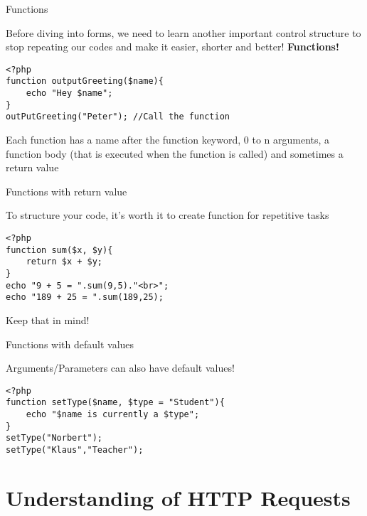 \begin{frame}[fragile]{Functions}

	Before diving into forms, we need to learn another important control structure to stop repeating our codes and make it easier, shorter and better! \pause  \textbf{Functions!} \pause
	
	\begin{lstlisting}
<?php
function outputGreeting($name){
	echo "Hey $name";
}
outPutGreeting("Peter"); //Call the function
	\end{lstlisting} \pause
	
	Each function has a name after the function keyword, 0 to n arguments, a function body (that is executed when the function is called) and sometimes a return value
	
\end{frame}

\begin{frame}[fragile]{Functions with return value}

	To structure your code, it's worth it to create function for repetitive tasks\pause
	
	\begin{lstlisting}
<?php
function sum($x, $y){
	return $x + $y;
}
echo "9 + 5 = ".sum(9,5)."<br>";
echo "189 + 25 = ".sum(189,25);
	\end{lstlisting} \pause
	
	Keep that in mind!
	
\end{frame}

\begin{frame}[fragile]{Functions with default values}

	Arguments/Parameters can also have default values! \pause
	
	\begin{lstlisting}
<?php
function setType($name, $type = "Student"){
	echo "$name is currently a $type";
}
setType("Norbert");
setType("Klaus","Teacher");
	\end{lstlisting} \pause
	
\end{frame}

\section{Understanding of HTTP Requests}

